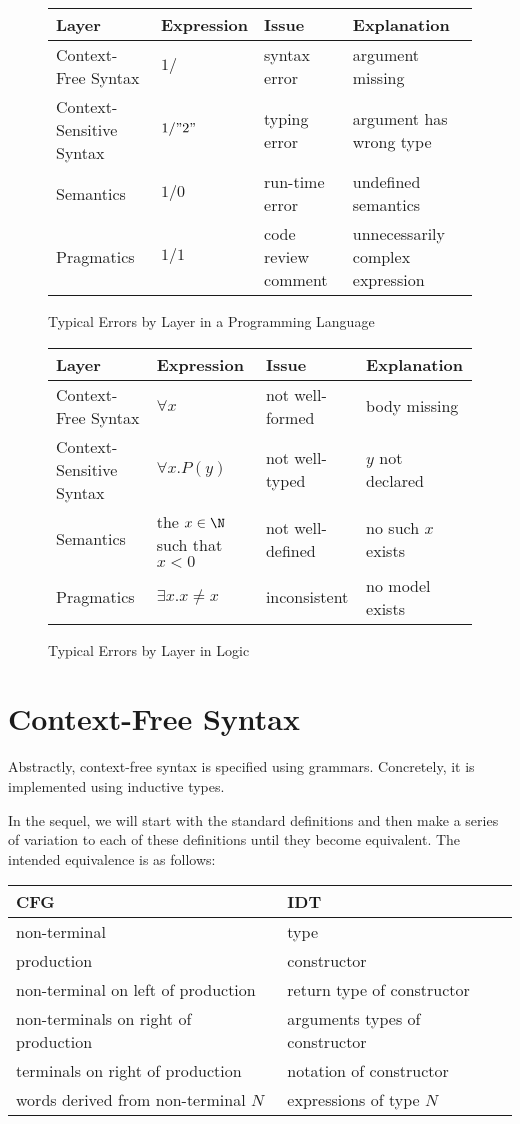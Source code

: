 \begin{figure}[hbt]
\begin{tabular}{l|lll}
Layer & Expression & Issue & Explanation \\\hline
Context-Free Syntax & $1/$ & syntax error & argument missing\\
Context-Sensitive Syntax & $1/"2"$ & typing error & argument has wrong type\\
Semantics & $1/0$ & run-time error & undefined semantics \\
Pragmatics & $1/1$ & code review comment & unnecessarily complex expression \\
\end{tabular}
\caption{Typical Errors by Layer in a Programming Language}\label{fig:errors-comp}
\end{figure}

\begin{figure}[hbt]
\begin{tabular}{l|lll}
Layer & Expression & Issue & Explanation \\\hline
Context-Free Syntax & $\forall x$ & not well-formed & body missing\\
Context-Sensitive Syntax & $\forall x.P(y)$ & not well-typed & $y$ not declared\\
Semantics & the $x\in \N$ such that $x<0$ & not well-defined & no such $x$ exists \\
Pragmatics & $\exists x.x\neq x$ & inconsistent & no model exists\\
\end{tabular}
\caption{Typical Errors by Layer in Logic}\label{fig:errors-ded}
\end{figure}


\section{Context-Free Syntax}

Abstractly, context-free syntax is specified using grammars.
Concretely, it is implemented using inductive types.

In the sequel, we will start with the standard definitions and then make a series of variation to each of these definitions until they become equivalent.
The intended equivalence is as follows:
\begin{center}
\begin{tabular}{l|l}
CFG & IDT \\
\hline
non-terminal & type \\
production & constructor \\
non-terminal on left of production & return type of constructor \\
non-terminals on right of production & arguments types of constructor \\
terminals on right of production & notation of constructor\\
words derived from non-terminal $N$ & expressions of type $N$
\end{tabular}
\end{center}

